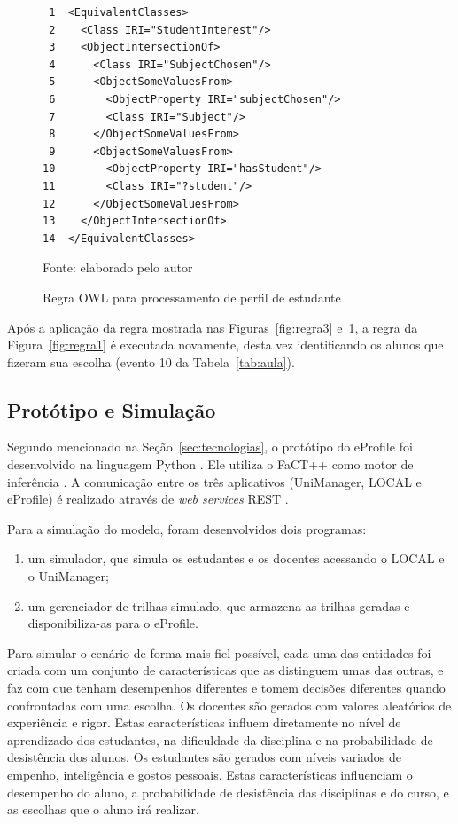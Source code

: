 \begin{figure}[!t]
  \caption{Regra OWL para processamento de perfil de estudante}
\begin{verbatim}
 1  <EquivalentClasses>
 2    <Class IRI="StudentInterest"/>
 3    <ObjectIntersectionOf>
 4      <Class IRI="SubjectChosen"/>
 5      <ObjectSomeValuesFrom>
 6        <ObjectProperty IRI="subjectChosen"/>
 7        <Class IRI="Subject"/>
 8      </ObjectSomeValuesFrom>
 9      <ObjectSomeValuesFrom>
10        <ObjectProperty IRI="hasStudent"/>
11        <Class IRI="?student"/>
12      </ObjectSomeValuesFrom>
13    </ObjectIntersectionOf>
14  </EquivalentClasses>
\end{verbatim}
  \label{fig:regra2}
  
Fonte: elaborado pelo autor
\end{figure}

Após a aplicação da regra mostrada nas Figuras~\ref{fig:regra3} e~\ref{fig:regra2}, a regra da Figura~\ref{fig:regra1} é executada novamente, desta vez identificando os alunos que fizeram sua escolha (evento 10 da Tabela~\ref{tab:aula}).



\subsection{Protótipo e Simulação}
\label{sec:simulacao_cen1}

Segundo mencionado na Seção~\ref{sec:tecnologias}, o protótipo do eProfile foi desenvolvido na linguagem Python \cite{python}. Ele utiliza o FaCT++ como motor de inferência \cite{tsarkov06}. A comunicação entre os três aplicativos (UniManager, LOCAL e eProfile) é realizado através de {\it web services} REST \cite{fielding00}.

Para a simulação do modelo, foram desenvolvidos dois programas:

\begin{enumerate}
  \item um simulador, que simula os estudantes e os docentes acessando o LOCAL e o UniManager;
  \item um gerenciador de trilhas simulado, que armazena as trilhas geradas e disponibiliza-as para o eProfile.
\end{enumerate}

Para simular o cenário de forma mais fiel possível, cada uma das entidades foi criada com um conjunto de características que as distinguem umas das outras, e faz com que tenham desempenhos diferentes e tomem decisões diferentes quando confrontadas com uma escolha. Os docentes são gerados com valores aleatórios de experiência e rigor. Estas características influem diretamente no nível de aprendizado dos estudantes, na dificuldade da disciplina e na probabilidade de desistência dos alunos. Os estudantes são gerados com níveis variados de empenho, inteligência e gostos pessoais. Estas características influenciam o desempenho do aluno, a probabilidade de desistência das disciplinas e do curso, e as escolhas que o aluno irá realizar.

